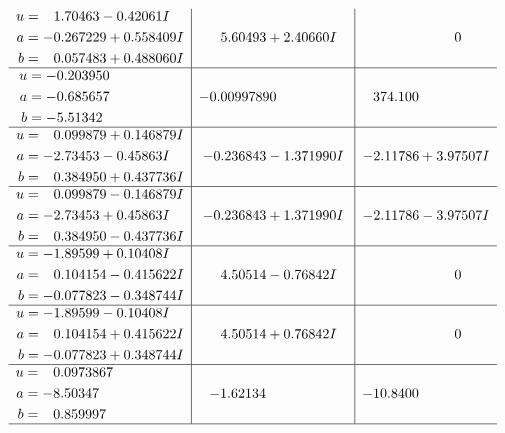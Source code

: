 \documentclass[1p]{elsarticle_modified}
\theoremstyle{definition}
\begin{document}
$$\begin{array}{c|c|c}
\begin{aligned}
u &= \phantom{-}1.70463 - 0.42061 I \\
a &= -0.267229 + 0.558409 I \\
b &= \phantom{-}0.057483 + 0.488060 I\end{aligned}
 & \phantom{-}5.60493 + 2.40660 I & \phantom{-0.000000 } 0 \\ \hline\begin{aligned}
u &= -0.203950\phantom{ +0.000000I} \\
a &= -0.685657\phantom{ +0.000000I} \\
b &= -5.51342\phantom{ +0.000000I}\end{aligned}
 & -0.00997890\phantom{ +0.000000I} & \phantom{-}374.100\phantom{ +0.000000I} \\ \hline\begin{aligned}
u &= \phantom{-}0.099879 + 0.146879 I \\
a &= -2.73453 - 0.45863 I \\
b &= \phantom{-}0.384950 + 0.437736 I\end{aligned}
 & -0.236843 - 1.371990 I & -2.11786 + 3.97507 I \\ \hline\begin{aligned}
u &= \phantom{-}0.099879 - 0.146879 I \\
a &= -2.73453 + 0.45863 I \\
b &= \phantom{-}0.384950 - 0.437736 I\end{aligned}
 & -0.236843 + 1.371990 I & -2.11786 - 3.97507 I \\ \hline\begin{aligned}
u &= -1.89599 + 0.10408 I \\
a &= \phantom{-}0.104154 - 0.415622 I \\
b &= -0.077823 - 0.348744 I\end{aligned}
 & \phantom{-}4.50514 - 0.76842 I & \phantom{-0.000000 } 0 \\ \hline\begin{aligned}
u &= -1.89599 - 0.10408 I \\
a &= \phantom{-}0.104154 + 0.415622 I \\
b &= -0.077823 + 0.348744 I\end{aligned}
 & \phantom{-}4.50514 + 0.76842 I & \phantom{-0.000000 } 0 \\ \hline\begin{aligned}
u &= \phantom{-}0.0973867\phantom{ +0.000000I} \\
a &= -8.50347\phantom{ +0.000000I} \\
b &= \phantom{-}0.859997\phantom{ +0.000000I}\end{aligned}
 & -1.62134\phantom{ +0.000000I} & -10.8400\phantom{ +0.000000I}\\
 \hline 
 \end{array}$$\newpage\newpage\renewcommand{\arraystretch}{1}
\end{document}
